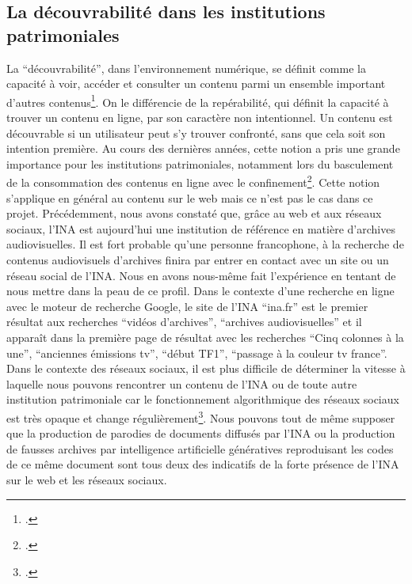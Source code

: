 \subsection{La découvrabilité dans les institutions patrimoniales}


La \enquote{découvrabilité}, dans l'environnement numérique, se définit comme la capacité à voir, accéder et consulter un contenu parmi un ensemble important d'autres contenus\footcite{decouvrabilite}. On le différencie de la repérabilité, qui définit la capacité à trouver un contenu en ligne, par son caractère non intentionnel. Un contenu est découvrable si un utilisateur peut s'y trouver confronté, sans que cela soit son intention première. Au cours des dernières années, cette notion a pris une grande importance pour les institutions patrimoniales, notamment lors du basculement de la consommation des contenus en ligne avec le confinement\footcite{decouvrabilite}. Cette notion s'applique en général au contenu sur le web mais ce n'est pas le cas dans ce projet. Précédemment, nous avons constaté que, grâce au web et aux réseaux sociaux, l'INA est aujourd'hui une institution de référence en matière d'archives audiovisuelles. Il est fort probable qu'une personne francophone, à la recherche de contenus audiovisuels d'archives finira par entrer en contact avec un site ou un réseau social de l'INA. Nous en avons nous-même fait l'expérience en tentant de nous mettre dans la peau de ce profil. Dans le contexte d'une recherche en ligne avec le moteur de recherche Google, le site de l'INA \enquote{ina.fr} est le premier résultat aux recherches \enquote{vidéos d'archives}, \enquote{archives audiovisuelles} et il apparaît dans la première page de résultat avec les recherches \enquote{Cinq colonnes à la une}, \enquote{anciennes émissions tv}, \enquote{début TF1}, \enquote{passage à la couleur tv france}. Dans le contexte des réseaux sociaux, il est plus difficile de déterminer la vitesse à laquelle nous pouvons rencontrer un contenu de l'INA ou de toute autre institution patrimoniale car le fonctionnement algorithmique des réseaux sociaux est très opaque et change régulièrement\footcite[252]{farchy2023}. Nous pouvons tout de même supposer que la production de parodies de documents diffusés par l'INA ou la production de fausses archives par intelligence artificielle génératives reproduisant les codes de ce même document sont tous deux des indicatifs de la forte présence de l'INA sur le web et les réseaux sociaux. 

